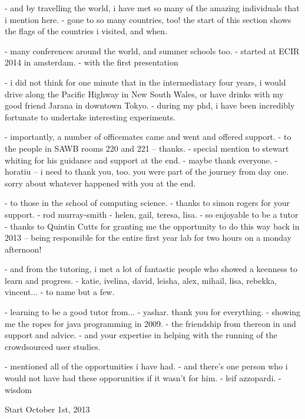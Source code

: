 \begin{preamble}
- and by travelling the world, i have met so many of the amazing individuals that i mention here.
- gone to so many countries, too! the start of this section shows the flags of the countries i visited, and when.

- many conferences around the world, and summer schools too.
    - started at ECIR 2014 in amsterdam.
    - with the first presentation 

- i did not think for one minute that in the intermediatary four years, i would drive along the Pacific Highway in New South Wales, or have drinks with my good friend Jarana in downtown Tokyo.
- during my phd, i have been incredibly fortunate to undertake interesting experiments.

- importantly, a number of officemates came and went and offered support.
- to the people in SAWB rooms 220 and 221 -- thanks.
    - special mention to stewart whiting for his guidance and support at the end.
    - maybe thank everyone.
    - horatiu -- i need to thank you, too. you were part of the journey from day one. sorry about whatever happened with you at the end.

- to those in the school of computing science.
    - thanks to simon rogers for your support.
    - rod murray-smith
    - helen, gail, teresa, lisa.
        - so enjoyable to be a tutor
        - thanks to Quintin Cutts for granting me the opportunity to do this way back in 2013 -- being responsible for the entire first year lab for two hours on a monday afternoon!
        
        - and from the tutoring, i met a lot of fantastic people who showed a keenness to learn and progress.
            - katie, ivelina, david, leisha, alex, mihail, lisa, rebekka, vincent...
            - to name but a few.
    
    - learning to be a good tutor from...
    - yashar. thank you for everything.
        - showing me the ropes for java programming in 2009.
        - the friendship from thereon in and support and advice.
        - and your expertise in helping with the running of the crowdsourced user studies.



- mentioned all of the opportunities i have had.
- and there's one person who i would not have had these opporunities if it wasn't for him.
- leif azzopardi.
- wisdom



Start October 1st, 2013






\end{preamble}
